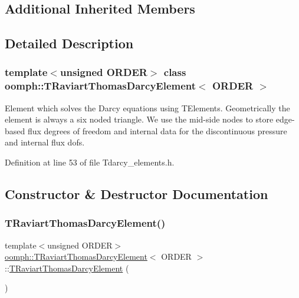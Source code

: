 \subsection*{Additional Inherited Members}


\subsection{Detailed Description}
\subsubsection*{template$<$unsigned O\+R\+D\+ER$>$\newline
class oomph\+::\+T\+Raviart\+Thomas\+Darcy\+Element$<$ O\+R\+D\+E\+R $>$}

Element which solves the Darcy equations using T\+Elements. Geometrically the element is always a six noded triangle. We use the mid-\/side nodes to store edge-\/based flux degrees of freedom and internal data for the discontinuous pressure and internal flux dofs. 

Definition at line 53 of file Tdarcy\+\_\+elements.\+h.



\subsection{Constructor \& Destructor Documentation}
\mbox{\label{classoomph_1_1TRaviartThomasDarcyElement_adb308fe884526fe0122b49d112e49b7a}} 
\subsubsection{\texorpdfstring{T\+Raviart\+Thomas\+Darcy\+Element()}{TRaviartThomasDarcyElement()}\hspace{0.1cm}{\footnotesize\ttfamily [1/3]}}
{\footnotesize\ttfamily template$<$unsigned O\+R\+D\+ER$>$ \\
\hyperlink{classoomph_1_1TRaviartThomasDarcyElement}{oomph\+::\+T\+Raviart\+Thomas\+Darcy\+Element}$<$ O\+R\+D\+ER $>$\+::\hyperlink{classoomph_1_1TRaviartThomasDarcyElement}{T\+Raviart\+Thomas\+Darcy\+Element} (\begin{DoxyParamCaption}{ }\end{DoxyParamCaption})}



